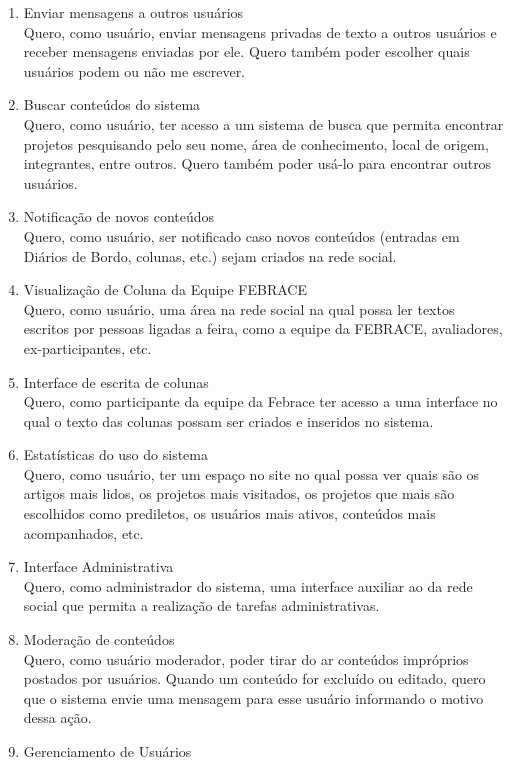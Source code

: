 \begin{enumerate}
    \item Enviar mensagens a outros usuários \\
      Quero, como usuário, enviar mensagens privadas de texto a outros usuários e receber mensagens enviadas por ele. Quero também poder escolher quais usuários podem ou não me escrever.
    \item Buscar conteúdos do sistema \\
      Quero, como usuário, ter acesso a  um sistema de busca que permita encontrar projetos pesquisando pelo seu nome, área de conhecimento, local de origem, integrantes, entre outros. Quero também poder usá-lo para encontrar outros usuários.
    \item Notificação de novos conteúdos \\
      Quero, como usuário, ser notificado caso novos conteúdos (entradas em Diários de Bordo, colunas, etc.) sejam criados na rede social.
    \item Visualização de Coluna da Equipe FEBRACE \\
      Quero, como usuário, uma área na rede social na qual possa ler textos escritos por pessoas ligadas a feira, como a equipe da FEBRACE, avaliadores, ex-participantes, etc.
    \item Interface de escrita de colunas \\
      Quero, como participante da equipe da Febrace ter acesso a uma interface no qual o texto das colunas possam ser criados e inseridos no sistema.
    \item Estatísticas do uso do sistema \\
      Quero, como usuário, ter um espaço no site no qual possa ver quais são os artigos mais lidos, os projetos mais visitados, os projetos que mais são escolhidos como prediletos, os usuários mais ativos, conteúdos mais acompanhados, etc.
    \item Interface Administrativa \\
      Quero, como administrador do sistema, uma interface auxiliar ao da rede social que permita a realização de tarefas administrativas.
    \item Moderação de conteúdos \\
      Quero, como usuário moderador, poder tirar do ar conteúdos impróprios postados por usuários. Quando um conteúdo for excluído ou editado, quero que o sistema envie uma mensagem para esse usuário informando o motivo dessa ação.
    \item Gerenciamento de Usuários \\

\end{enumerate}
